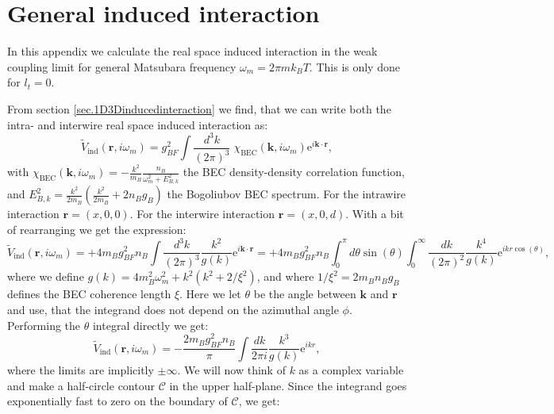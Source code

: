 
\chapter{General induced interaction} %

\label{Appendix.inducedinteraction.realspace} %

In this appendix we calculate the real space induced interaction in the weak coupling limit for general Matsubara frequency $\omega_m = 2\pi m k_B T$. This is only done for $l_t = 0$. 

From section \ref{sec.1D3Dinducedinteraction} we find, that we can write both the intra- and interwire real space induced interaction as:
\begin{equation}
\tilde{V}_{\text{ind}}(\mathbf{r}, i\omega_m) = g_{BF}^2\int\frac{d^3k}{(2\pi)^3}\; \chi_\text{BEC}(\mathbf{k}, i\omega_m)\text{e}^{i\mathbf{k}\cdot \mathbf{r}}, 
\label{eq.limitVindxomegam}
\end{equation}
with $\chi_\text{BEC}(\mathbf{k}, i\omega_m) = -\frac{k^2}{m_B}\frac{n_B}{\omega^2_m + E_{B,k}^2}$ the BEC density-density correlation function, and $E^2_{B,k} = \frac{k^2}{2m_B}\left(\frac{k^2}{2m_B} + 2n_Bg_B\right)$ the Bogoliubov BEC spectrum. For the intrawire interaction $\mathbf{r} = (x, 0, 0)$. For the interwire interaction $\mathbf{r} = (x, 0, d)$. With a bit of rearranging we get the expression:
\begin{equation}
\tilde{V}_{\text{ind}}(\mathbf{r}, i\omega_m) = +4m_Bg^2_{BF}n_B\int \frac{d^3k}{(2\pi)^3} \frac{k^2}{g(k)}\text{e}^{i\mathbf{k}\cdot\mathbf{r}} = +4m_Bg^2_{BF}n_B\int_0^\pi d\theta \sin(\theta)\int_0^{\infty} \frac{dk}{(2\pi)^2} \frac{k^4}{g(k)}\text{e}^{ikr\cos(\theta)}, \nonumber
\end{equation}
where we define $g(k) = 4m_B^2\omega^2_m + k^2(k^2 + 2/\xi^2)$, and where $1/\xi^2 = 2m_Bn_Bg_B$ defines the BEC coherence length $\xi$. Here we let $\theta$ be the angle between $\mathbf{k}$ and $\mathbf{r}$ and use, that the integrand does not depend on the azimuthal angle $\phi$. Performing the $\theta$ integral directly we get:
\begin{equation}
\tilde{V}_{\text{ind}}(\mathbf{r}, i\omega_m) = -\frac{2m_Bg^2_{BF}n_B}{\pi}\int \frac{dk}{2\pi i} \frac{k^3}{g(k)}\text{e}^{ikr}, \nonumber
\end{equation}
where the limits are implicitly $\pm \infty$. We will now think of $k$ as a complex variable and make a half-circle contour $\mathcal{C}$ in the upper half-plane. Since the integrand goes exponentially fast to zero on the boundary of $\mathcal{C}$, we get:
